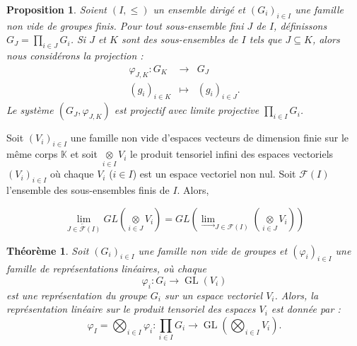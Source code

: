 \documentclass[9pt]{beamer}
\newtheorem{proposition}{Proposition}
\newtheorem{theoreme}{Théorème}
\begin{document}
\begin{frame}
	\begin{proposition}
Soient $(I, \leq)$ un ensemble dirigé et $(G_i)_{i\in I}$ une famille non vide de groupes finis. Pour tout sous-ensemble fini $J$ de $I$, définissons $G_J = \underset{i\in J}\prod G_i$. Si $J$ et $K$ sont des sous-ensembles de $I$ tels que $J\subseteq K$, alors nous considérons la projection :
	$$\begin{array}{rlll}\varphi_{J, K}: G_K&\longrightarrow &G_J\\
		(g_i)_{i\in K}&\longmapsto&(g_i)_{i\in J}.
	\end{array}
$$ Le système $(G_J,\varphi_{J, K})$ est projectif avec limite projective $\underset{i\in I} \prod G_i$.
	\end{proposition}
	
	\begin{lemma}
Soit $(V_i)_{i\in I}$ une famille non vide d'espaces vecteurs de dimension finie sur le même corps \( \mathbb{K} \) et soit \( \underset{i\in I}\otimes V_i \) le produit tensoriel infini des espaces vectoriels \( (V_i)_{i\in I} \) où chaque \( V_i \) (\( i \in I \)) est un espace vectoriel non nul. Soit \( \mathcal{F}(I) \) l'ensemble des sous-ensembles finis de \( I \). Alors, 
		
		\[
		\underset{\overleftarrow{J \in \mathcal{F}(I)}}{\lim} GL\left( \underset{i \in J}{\otimes} V_i \right) = GL\left( \underset{\longrightarrow}{\lim}_{J \in \mathcal{F}(I)} \left( \underset{i \in J}{\otimes} V_i \right) \right)
		\]
	\end{lemma}
	
\end{frame}


\begin{frame}
\begin{theoreme} 
Soit \( (G_i)_{i \in I} \) une famille non vide de groupes et \( (\varphi_i)_{i \in I} \) une famille de représentations linéaires, où chaque  
	\[
	\varphi_i : G_i \to \operatorname{GL}(V_i)
	\]
	est une représentation du groupe \( G_i \) sur un espace vectoriel \( V_i \).  
	Alors, la représentation linéaire sur le produit tensoriel des espaces \( V_i \) est donnée par :
	\[
	\varphi_I = \bigotimes_{i \in I} \varphi_i : \prod_{i \in I} G_i \longrightarrow \operatorname{GL} \left( \bigotimes_{i \in I} V_i \right).
	\]
\end{theoreme}
\end{frame}
\end{document}
